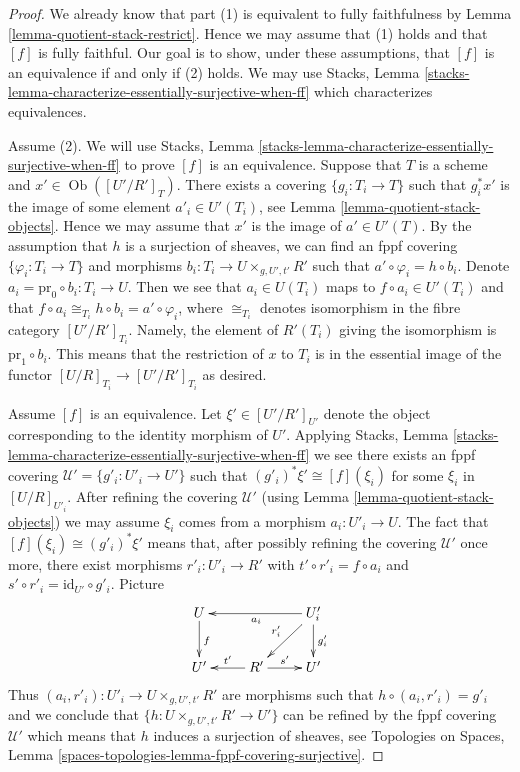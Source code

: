 \documentclass[10pt,a4paper]{amsart}
\theoremstyle{plain}
\theoremstyle{definition}
\theoremstyle{remark}
\numberwithin{equation}{subsection}
\def\Ob{\mathop{\mathrm{Ob}}\nolimits}
\begin{document}
\begin{proof}
We already know that part (1) is equivalent to
fully faithfulness by
Lemma \ref{lemma-quotient-stack-restrict}.
Hence we may assume that (1) holds and that $[f]$ is fully faithful.
Our goal is to show, under these assumptions, that $[f]$ is an equivalence
if and only if (2) holds. We may use
Stacks, Lemma \ref{stacks-lemma-characterize-essentially-surjective-when-ff}
which characterizes equivalences.

\medskip\noindent
Assume (2). We will use
Stacks, Lemma \ref{stacks-lemma-characterize-essentially-surjective-when-ff}
to prove $[f]$ is an equivalence.
Suppose that $T$ is a scheme and $x' \in \Ob([U'/R']_T)$.
There exists a covering $\{g_i : T_i \to T\}$ such that $g_i^*x'$
is the image of some element $a'_i \in U'(T_i)$, see
Lemma \ref{lemma-quotient-stack-objects}.
Hence we may assume that $x'$ is the image of $a' \in U'(T)$.
By the assumption that $h$ is a surjection of sheaves, we
can find an fppf covering $\{\varphi_i : T_i \to T\}$ and morphisms
$b_i : T_i \to U \times_{g, U', t'} R'$ such that
$a' \circ \varphi_i = h \circ b_i$. Denote
$a_i = \text{pr}_0 \circ b_i : T_i \to U$. Then we see that
$a_i \in U(T_i)$ maps to $f \circ a_i \in U'(T_i)$ and
that $f \circ a_i \cong_{T_i} h \circ b_i = a' \circ \varphi_i$,
where $\cong_{T_i}$ denotes isomorphism in the fibre category
$[U'/R']_{T_i}$. Namely, the element of $R'(T_i)$ giving the isomorphism
is $\text{pr}_1 \circ b_i$. This means that the restriction
of $x$ to $T_i$ is in the essential image of the functor
$[U/R]_{T_i} \to [U'/R']_{T_i}$ as desired.

\medskip\noindent
Assume $[f]$ is an equivalence. Let $\xi' \in [U'/R']_{U'}$ denote the
object corresponding to the identity morphism of $U'$. Applying
Stacks, Lemma \ref{stacks-lemma-characterize-essentially-surjective-when-ff}
we see there exists an fppf covering $\mathcal{U}' = \{g'_i : U'_i \to U'\}$
such that $(g'_i)^*\xi' \cong [f](\xi_i)$ for some $\xi_i$ in $[U/R]_{U'_i}$.
After refining the covering $\mathcal{U}'$ (using
Lemma \ref{lemma-quotient-stack-objects})
we may assume $\xi_i$ comes from a morphism $a_i : U'_i \to U$.
The fact that $[f](\xi_i) \cong (g'_i)^*\xi'$ means that, after possibly
refining the covering $\mathcal{U}'$ once more, there exist morphisms
$r'_i : U'_i \to R'$ with $t' \circ r'_i = f \circ a_i$ and
$s' \circ r'_i = \text{id}_{U'} \circ g'_i$. Picture
$$
\xymatrix{
U \ar[d]^f & & U'_i \ar[ll]^{a_i} \ar[ld]_{r'_i} \ar[d]^{g'_i} \\
U' & R' \ar[l]_{t'} \ar[r]^{s'} & U'
}
$$
Thus $(a_i, r'_i) : U'_i \to U \times_{g, U', t'} R'$ are morphisms
such that $h \circ (a_i, r'_i) = g'_i$ and we conclude that
$\{h : U \times_{g, U', t'} R' \to U'\}$ can be refined by the
fppf covering $\mathcal{U}'$ which means that $h$ induces a surjection
of sheaves, see
Topologies on Spaces, Lemma
\ref{spaces-topologies-lemma-fppf-covering-surjective}.


\end{proof}
\end{document}
